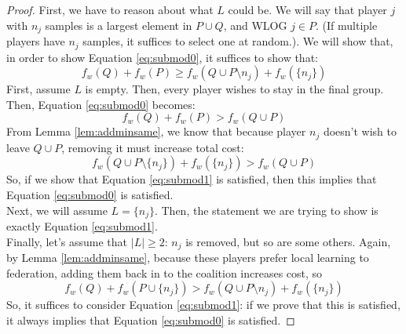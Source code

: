 \documentclass{article}
\newcommand{\ndraw}[0]{\ensuremath{n}}
\newcommand{\costw}[0]{\ensuremath{f_w}}
\begin{document}
\begin{proof}
First, we have to reason about what $L$ could be. We will say that player $j$ with $\ndraw_j$ samples is a largest element in $P \cup Q$, and WLOG $j \in P$. (If multiple players have $\ndraw_j$ samples, it suffices to select one at random.). We will show that, in order to show Equation \ref{eq:submod0}, it suffices to show that:
\begin{equation}\label{eq:submod1}
\costw(Q) + \costw(P) \geq \costw(Q\cup P\setminus \ndraw_j) + \costw(\{\ndraw_j\})
\end{equation}
First, assume $L$ is empty. Then, every player wishes to stay in the final group. Then, Equation \ref{eq:submod0} becomes:
$$\costw(Q) + \costw(P) > \costw(Q\cup P)$$
From Lemma \ref{lem:addminsame}, we know that because player $\ndraw_j$ doesn't wish to leave $Q\cup P$, removing it must increase total cost:
$$\costw(Q\cup P\setminus \{\ndraw_j\}) + \costw(\{\ndraw_j\})>\costw(Q\cup P)$$
So, if we show that Equation \ref{eq:submod1} is satisfied, then this implies that Equation \ref{eq:submod0} is satisfied. \\
Next, we will assume $L = \{\ndraw_j\}$. Then, the statement we are trying to show is exactly Equation \ref{eq:submod1}.\\
Finally, let's assume that $\vert L\vert \geq 2$: $\ndraw_j$ is removed, but so are some others. Again, by Lemma \ref{lem:addminsame}, because these players prefer local learning to federation, adding them back in to the coalition increases cost, so 
$$\costw(Q) + \costw(P\cup \{\ndraw_j\}) >\costw(Q\cup P\setminus \ndraw_j) + \costw(\{\ndraw_j\})$$
So, it suffices to consider Equation \ref{eq:submod1}: if we prove that this is satisfied, it always implies that Equation \ref{eq:submod0} is satisfied.  


\end{proof}
\end{document}
